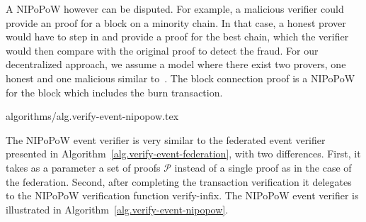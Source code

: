 A NIPoPoW however can be disputed. For example, a malicious verifier could provide an proof for a block on a minority chain. In that case, a honest prover would have to step in and provide a proof for the best chain, which the verifier would then compare with the original proof to detect the fraud. For our decentralized approach, we assume a model where there exist two provers, one honest and one malicious similar to~\cite{nipopows,flyclient}. The block connection proof is a NIPoPoW for the block which includes the burn transaction.

{algorithms/alg.verify-event-nipopow.tex}

The NIPoPoW event verifier is very similar to the federated event verifier presented in Algorithm~\ref{alg.verify-event-federation}, with two differences. First, it takes as a parameter a set of proofs $\mathcal{P}$ instead of a single proof as in the case of the federation. Second, after completing the transaction verification it delegates to the NIPoPoW verification function \textsf{verify-infix}. The NIPoPoW event verifier is illustrated in Algorithm~\ref{alg.verify-event-nipopow}.
